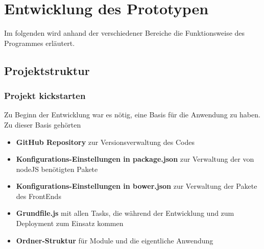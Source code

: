 \chapter{Entwicklung des Prototypen}
Im folgenden wird anhand der verschiedener Bereiche die Funktionsweise des Programmes erläutert. 


\section{Projektstruktur}
\subsection{Projekt kickstarten}
Zu Beginn der Entwicklung war es nötig, eine Basis für die Anwendung zu haben. Zu dieser Basis gehörten
\begin{itemize}
\item \textbf{GitHub Repository} zur Versionsverwaltung des Codes
\item \textbf{Konfigurations-Einstellungen in package.json} zur Verwaltung der von nodeJS benötigten Pakete
\item \textbf{Konfigurations-Einstellungen in bower.json} zur Verwaltung der Pakete des FrontEnds
\item \textbf{Grundfile.js} mit allen Tasks, die während der Entwicklung und zum Deployment zum Einsatz kommen
\item \textbf{Ordner-Struktur} für Module und die eigentliche Anwendung
\end{itemize}

